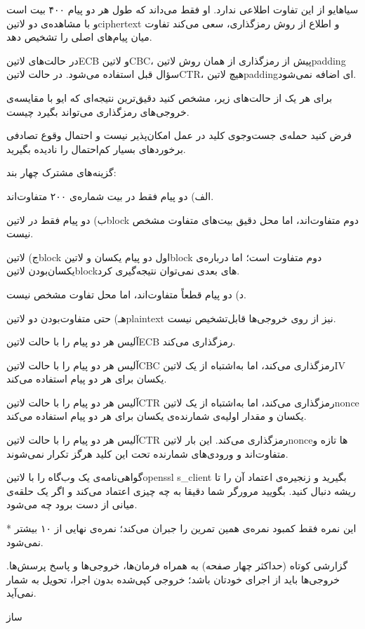 \documentclass{../is-assignment}
\begin{document}
‌سیاه{ایو از این تفاوت اطلاعی ندارد.}
او فقط می‌داند که طول هر دو پیام ۴۰۰ بیت است
و با مشاهده‌ی دو ‌لاتین{ciphertext} و اطلاع از روش رمزگذاری،
سعی می‌کند تفاوت میان پیام‌های اصلی را تشخیص دهد.

در حالت‌های ‌لاتین{ECB} و ‌لاتین{CBC}،
پیش از رمزگذاری از همان روش ‌لاتین{padding} سؤال قبل استفاده می‌شود.
در حالت ‌لاتین{CTR}، هیچ ‌لاتین{padding}ای اضافه نمی‌شود.

برای هر یک از حالت‌های زیر، مشخص کنید
دقیق‌ترین نتیجه‌ای که ایو
با مقایسه‌ی خروجی‌های رمزگذاری می‌تواند بگیرد چیست.

فرض کنید حمله‌ی جست‌وجوی کلید در عمل امکان‌پذیر نیست
و احتمال وقوع تصادفی برخوردهای بسیار کم‌احتمال را نادیده بگیرید.

گزینه‌های مشترک چهار بند:

 الف)
دو پیام فقط در بیت شماره‌ی ۲۰۰ متفاوت‌اند.

 ب)
دو پیام فقط در ‌لاتین{block} دوم متفاوت‌اند،
اما محل دقیق بیت‌های متفاوت مشخص نیست.

 ج)
‌لاتین{block} اول دو پیام یکسان و
‌لاتین{block} دوم متفاوت است؛
اما درباره‌ی یکسان‌بودن ‌لاتین{block}های بعدی
نمی‌توان نتیجه‌گیری کرد.

 د)
دو پیام قطعاً متفاوت‌اند،
اما محل تفاوت مشخص نیست.

 هـ)
حتی متفاوت‌بودن دو ‌لاتین{plaintext}
نیز از روی خروجی‌ها قابل‌تشخیص نیست.

آلیس هر دو پیام را با حالت
‌لاتین{ECB} رمزگذاری می‌کند.

آلیس هر دو پیام را با حالت
‌لاتین{CBC} رمزگذاری می‌کند،
اما به‌اشتباه از یک ‌لاتین{IV} یکسان
برای هر دو پیام استفاده می‌کند.

آلیس هر دو پیام را با حالت
‌لاتین{CTR} رمزگذاری می‌کند،
اما به‌اشتباه از یک ‌لاتین{nonce} یکسان
و مقدار اولیه‌ی شمارنده‌ی یکسان برای هر دو پیام استفاده می‌کند.

آلیس هر دو پیام را با حالت
‌لاتین{CTR} رمزگذاری می‌کند.
این بار ‌لاتین{nonce}ها تازه و متفاوت‌اند
و ورودی‌های شمارنده تحت این کلید هرگز تکرار نمی‌شوند.



گواهی‌نامه‌ی یک وب‌گاه را با ‌لاتین{openssl s\_client} بگیرید و زنجیره‌ی اعتماد آن را تا ریشه دنبال کنید.
بگویید مرورگر شما دقیقا به چه چیزی اعتماد می‌کند و اگر یک حلقه‌ی میانی از دست برود چه می‌شود.

* این نمره فقط کمبود نمره‌ی همین تمرین را جبران می‌کند؛ نمره‌ی نهایی از ۱۰ بیشتر نمی‌شود.


\newpage
{}

گزارشی کوتاه (حداکثر چهار صفحه) به همراه فرمان‌ها، خروجی‌ها و پاسخ پرسش‌ها.
خروجی‌ها باید از اجرای خودتان باشد؛ خروجی کپی‌شده بدون اجرا، تحویل به شمار نمی‌آید.


‌ساز
\end{document}
